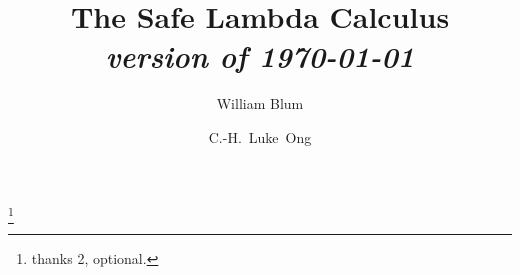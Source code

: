 



\title[The Safe Lambda Calculus]{The Safe Lambda Calculus \\ {\small \it version of \today}}

\author[W.Blum and C.-H. L.Ong]{William Blum}   %
\address{Oxford University Computing Laboratory, Oxford, UK}    %

\author[]{C.-H.~Luke~Ong}   %
\address{Oxford University Computing Laboratory, Oxford, UK} %
\thanks{thanks 2, optional.}    %







